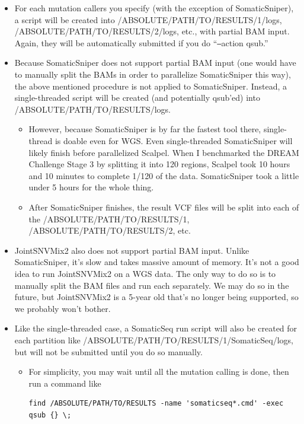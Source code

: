 \documentclass[10pt,letterpaper]{article}
\begin{document}
\begin{sloppypar}
\begin{itemize}
  \item
  For each mutation callers you specify (with the exception of SomaticSniper), a script will be created into /ABSOLUTE/PATH/TO/RESULTS/1/logs, /ABSOLUTE/PATH/TO/RESULTS/2/logs, etc., with partial BAM input. Again, they will be automatically submitted if you do ``\texttt{--}action qsub.''
  
  \item
  Because SomaticSniper does not support partial BAM input (one would have to manually split the BAMs in order to parallelize SomaticSniper this way), the above mentioned procedure is not applied to SomaticSniper. Instead, a single-threaded script will be created (and potentially qsub'ed) into /ABSOLUTE/PATH/TO/RESULTS/logs.

    \begin{itemize}
    \item However, because SomaticSniper is by far the fastest tool there, single-thread is doable even for WGS. Even single-threaded SomaticSniper will likely finish before parallelized Scalpel. When I benchmarked the DREAM Challenge Stage 3 by splitting it into 120 regions, Scalpel took 10 hours and 10 minutes to complete 1/120 of the data. SomaticSniper took a little under 5 hours for the whole thing.

    \item After SomaticSniper finishes, the result VCF files will be split into each of the /ABSOLUTE/PATH/TO/RESULTS/1, /ABSOLUTE/PATH/TO/RESULTS/2, etc.
    \end{itemize}


  \item
  JointSNVMix2 also does not support partial BAM input. Unlike SomaticSniper, it's slow and takes massive amount of memory. It's not a good idea to run JointSNVMix2 on a WGS data. The only way to do so is to manually split the BAM files and run each separately. We may do so in the future, but JointSNVMix2 is a 5-year old that's no longer being supported, so we probably won't bother.

  \item
  Like the single-threaded case, a SomaticSeq run script will also be created for each partition like /ABSOLUTE/PATH/TO/RESULTS/1/SomaticSeq/logs, but will not be submitted until you do so manually.

      
    \begin{itemize}
    \item   
    For simplicity, you may wait until all the mutation calling is done, then run a command like 
    \begin{lstlisting}
find /ABSOLUTE/PATH/TO/RESULTS -name 'somaticseq*.cmd' -exec qsub {} \;
    \end{lstlisting}


\end{itemize}
\end{itemize}
\end{sloppypar}
\end{document}
